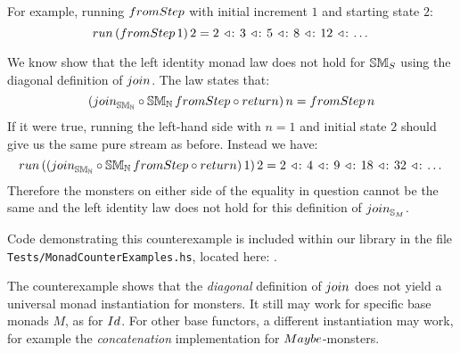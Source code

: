 For example, running $\fromstepstr$ with initial increment $1$ and starting state $2$:
$$
\strun\,(\fromstepstr\, 1)\, 2 = 2\, \acons\, 3\, \acons\, 5\, \acons\, 8\, \acons\, 12\, \acons\, \dots
$$

We know show that the left identity monad law does not hold for $\mathbb{SM}_{S}$ using the diagonal definition of $\join$.
The law states that:
$$
(\join_{\stmon{\nat}} \comp \stmon{\nat}\, \fromstepstr \comp \return)\, n = \fromstepstr\, n
$$
If it were true, running the left-hand side with $n = 1$ and initial state $2$ should give us the same pure stream as before.
Instead we have:
$$
\strun\, ((\join_{\stmon{\nat}} \comp \stmon{\nat}\, \fromstepstr \comp \return)\, 1)\, 2 = 2\, \acons\, 4\, \acons\, 9\, \acons\, 18\, \acons\, 32\, \acons\, \dots
$$
Therefore the monsters on either side of the equality in question cannot be the same and the left identity law does not hold for this definition of $\join_{\stream{M}}$.

Code demonstrating this counterexample is included within our library in the file {\tt Tests/MonadCounterExamples.hs}, located here: \repourl. 

The counterexample shows that the {\em diagonal} definition of $\join$ does not yield a universal monad instantiation for monsters. 
It still may work for specific base monads $M$, as for $\Id$.
For other base functors, a different instantiation may work, for example the {\em concatenation} implementation for $\maybe$-monsters.
